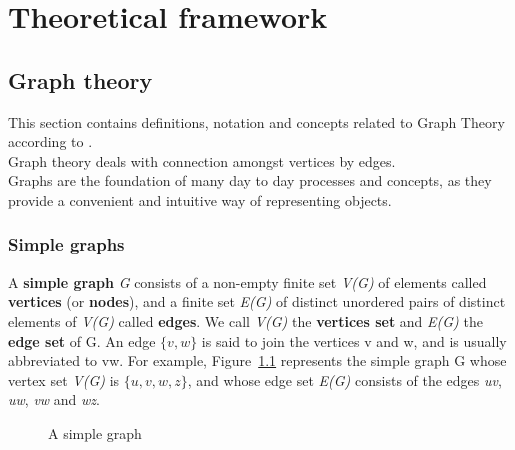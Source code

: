 \chapter{Theoretical framework}
\label{sec:theoretical_framework}

\section{Graph theory}
This section contains definitions, notation and concepts related to Graph Theory according
to \cite{graph_theory:2010}. \\
Graph theory deals with connection amongst vertices by edges. \\
Graphs are the foundation of many day to day processes and concepts, as they provide a convenient
and intuitive way of representing objects.

\subsection{Simple graphs}
A \textbf{simple graph} \textit{G} consists of a non-empty finite set \textit{V(G)} of elements called \textbf{vertices}
(or \textbf{nodes}), and a finite set \textit{E(G)} of distinct unordered pairs of distinct elements of \textit{V(G)}
called \textbf{edges}. We call \textit{V(G)} the \textbf{vertices set} and \textit{E(G)} the \textbf{edge set} of G.
An edge $\{\textit{v}, \textit{w}\}$ is said to join the vertices v and w, and is usually abbreviated to vw. For example, Figure~\ref{fig:simple_graph} represents the simple graph G whose vertex set \textit{V(G)} is $\{\textit{u}, \textit{v}, \textit{w}, \textit{z}\}$, and whose
edge set \textit{E(G)} consists of the edges \textit{uv}, \textit{uw}, \textit{vw} and \textit{wz}. 

\begin{figure}[H]
    \centering
    \caption{A simple graph}
    \label{fig:simple_graph}
\end{figure}

